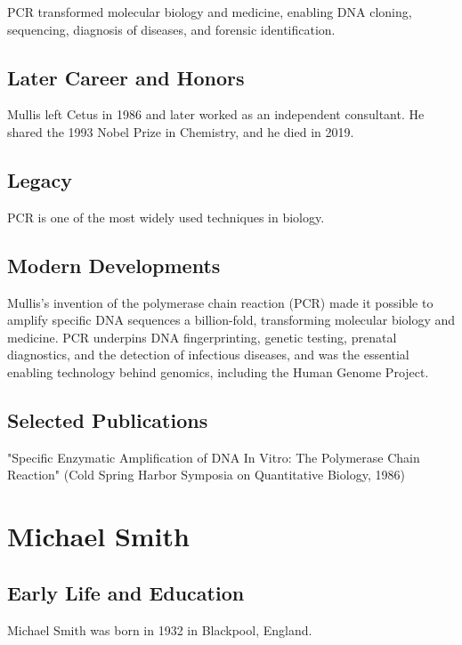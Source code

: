 PCR transformed molecular biology and medicine, enabling DNA cloning, sequencing, diagnosis of diseases, and forensic identification.

\subsection*{Later Career and Honors}

Mullis left Cetus in 1986 and later worked as an independent consultant. He shared the 1993 Nobel Prize in Chemistry, and he died in 2019.

\subsection*{Legacy}

PCR is one of the most widely used techniques in biology.

\subsection*{Modern Developments}

Mullis's invention of the polymerase chain reaction (PCR) made it possible to amplify specific DNA sequences a billion-fold, transforming molecular biology and medicine. PCR underpins DNA fingerprinting, genetic testing, prenatal diagnostics, and the detection of infectious diseases, and was the essential enabling technology behind genomics, including the Human Genome Project.

\subsection*{Selected Publications}

"Specific Enzymatic Amplification of DNA In Vitro: The Polymerase Chain Reaction" (Cold Spring Harbor Symposia on Quantitative Biology, 1986)

\clearpage

\section{Michael Smith}

\subsection*{Early Life and Education}

Michael Smith was born in 1932 in Blackpool, England.

